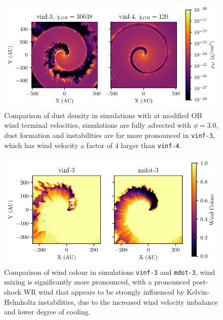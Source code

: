 


\begin{figure}
  \centering
  \includegraphics{assets/results/vinf/vinf-rhod.pdf}
  \caption[OB terminal velocity wind dust comparison]{Comparison of dust density in simulations with at modified OB wind terminal velocities, simulations are fully advected with $\phi = 3.0$, dust formation and instabilities are far more pronounced in \texttt{vinf-3}, which has wind velocity a factor of 4 larger than \texttt{vinf-4}.}
  \label{fig:obvinfzcomp}
\end{figure}

\begin{figure}
  \centering
  \includegraphics{assets/results/mixed/eta-004-comparison-r0.pdf}
  \caption[Wind colour comparison of $\eta = 0.04$ winds]{Comparison of wind colour in simulations \texttt{vinf-3} and \texttt{mdot-3}, wind mixing is significantly more pronounced, with a pronounced post-shock WR wind that appears to be strongly influenced by Kelvin-Helmholtz instabilities, due to the increased wind velocity imbalance and lower degree of cooling.}
  \label{fig:eta004comparisoncolour}
\end{figure}

